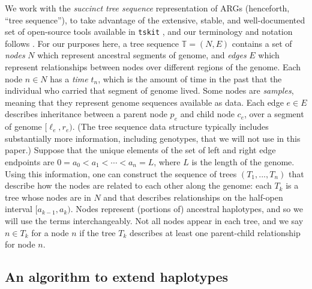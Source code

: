 \documentclass[10pt,twoside,lineno]{gsajnl}
\newcommand{\T}{\mathbb{T}}
\newcommand{\tskit}{\texttt{tskit}}
\begin{document}
We work with the \emph{succinct tree sequence} representation of ARGs (henceforth, ``tree sequence''),
to take advantage of the extensive, stable, and well-documented set of open-source tools
available in \tskit{} \citep{tskit}, 
and our terminology and notation follows \citet{ralph2020efficiently}.
For our purposes here,
a tree sequence $\T = (N, E)$ contains a set of \emph{nodes} $N$ 
which represent ancestral segments of genome,
and \emph{edges} $E$ which represent relationships between nodes over different regions of the genome.
Each node $n \in N$ has a \emph{time} $t_n$,
which is the amount of time in the past that the individual who carried that segment of genome lived.
Some nodes are \emph{samples}, meaning that they represent genome sequences available as data.
Each edge $e \in E$ describes inheritance between a parent node $p_e$ and child node $c_e$,
over a segment of genome $[\ell_e, r_e)$.
(The tree sequence data structure typically includes substantially more information, including genotypes, that we will not use in this paper.)
Suppose that the unique elements of the set of left and right edge endpoints
are $0 = a_0 < a_1 < \cdots < a_{n} = L$, where $L$ is the length of the genome.
Using this information, one can construct the sequence of 
trees $\left(T_1,...,T_{n}\right)$ that describe how the nodes are related to each other along the genome:
each $T_k$ is a tree whose nodes are in $N$
and that describes relationships on the half-open interval $[a_{k-1}, a_k)$.
Nodes represent (portions of) ancestral haplotypes, and so
we will use the terms interchangeably.
Not all nodes appear in each tree,
and we say $n \in T_k$ for a node $n$ if the tree $T_k$ describes at least one parent-child relationship
for node $n$.

\subsection{An algorithm to extend haplotypes}
\end{document}
